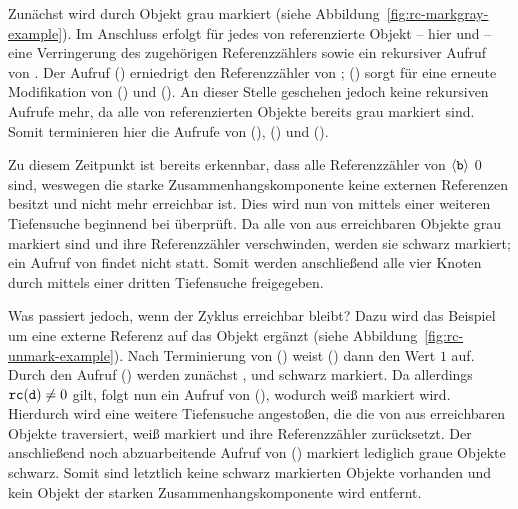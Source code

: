 Zunächst wird durch  Objekt  grau markiert (siehe Abbildung~\ref{fig:rc-markgray-example}).
Im Anschluss erfolgt für jedes von  referenzierte Objekt -- hier  und  -- eine Verringerung des zugehörigen Referenzzählers sowie ein rekursiver Aufruf von .
Der Aufruf () erniedrigt den Referenzzähler von ; () sorgt für eine erneute Modifikation von () und ().
An dieser Stelle geschehen jedoch keine rekursiven Aufrufe mehr, da alle von  referenzierten Objekte bereits grau markiert sind.
Somit terminieren hier die Aufrufe von (), () und ().

Zu diesem Zeitpunkt ist bereits erkennbar, dass alle Referenzzähler von $\left\langle\texttt{b}\right\rangle$ $0$ sind, weswegen die starke Zusammenhangskomponente keine externen Referenzen besitzt und nicht mehr erreichbar ist.
Dies wird nun von  mittels einer weiteren Tiefensuche beginnend bei  überprüft.
Da alle von  aus erreichbaren Objekte grau markiert sind und ihre Referenzzähler verschwinden, werden sie schwarz markiert; ein Aufruf von  findet nicht statt.
Somit werden anschließend alle vier Knoten durch  mittels einer dritten Tiefensuche freigegeben.

Was passiert jedoch, wenn der Zyklus erreichbar bleibt?
Dazu wird das Beispiel um eine externe Referenz auf das Objekt  ergänzt (siehe Abbildung~\ref{fig:rc-unmark-example}).
Nach Terminierung von () weist () dann den Wert $1$ auf.
Durch den Aufruf () werden zunächst ,  und  schwarz markiert.
Da allerdings $\texttt{rc}(\texttt{d}) \neq 0$ gilt, folgt nun ein Aufruf von (), wodurch  weiß markiert wird.
Hierdurch wird eine weitere Tiefensuche angestoßen, die die von  aus erreichbaren Objekte traversiert, weiß markiert und ihre Referenzzähler zurücksetzt.
Der anschließend noch abzuarbeitende Aufruf von () markiert lediglich graue Objekte schwarz.
Somit sind letztlich keine schwarz markierten Objekte vorhanden und kein Objekt der starken Zusammenhangskomponente wird entfernt.

